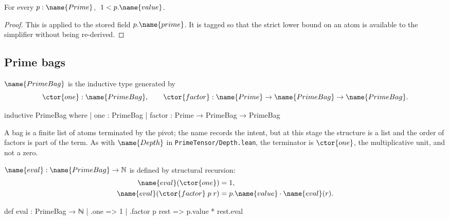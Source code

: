 \begin{lemma}\label{Prime:lem:one-lt}
For every $p : \name{Prime}$, $\; 1 < p.\name{value}$.
\end{lemma}

\begin{proof}
This is  applied to the stored field
$p.\name{prime}$.  It is tagged  so that the strict lower bound
on an atom is available to the simplifier without being re-derived.
\end{proof}

\subsection{Prime bags}

\begin{definition}\label{Prime:def:primebag}
$\name{PrimeBag}$ is the inductive type generated by
\[
  \ctor{one} : \name{PrimeBag},
  \qquad
  \ctor{factor} : \name{Prime} \to \name{PrimeBag} \to \name{PrimeBag}.
\]
\end{definition}

\begin{leancode}
inductive PrimeBag where
  | one : PrimeBag
  | factor : Prime → PrimeBag → PrimeBag
\end{leancode}

A bag is a finite list of atoms terminated by the pivot; the name records the
intent, but at this stage the structure is a list and the order of factors is
part of the term.  As with $\name{Depth}$ in
\texttt{PrimeTensor/Depth.lean}, the terminator is $\ctor{one}$, the multiplicative
unit, and not a zero.

\begin{definition}
\label{Prime:def:bag-eval}
$\name{eval} : \name{PrimeBag} \to \mathbb{N}$ is defined by structural
recursion:
\begin{align}
  \name{eval}(\ctor{one}) &= 1, \label{Prime:eq:eval-one}\\
  \name{eval}(\ctor{factor}\;p\;r) &= p.\name{value} \cdot \name{eval}(r).
    \label{Prime:eq:eval-factor}
\end{align}
\end{definition}

\begin{leancode}
def eval : PrimeBag → ℕ
  | .one => 1
  | .factor p rest => p.value * rest.eval
\end{leancode}


